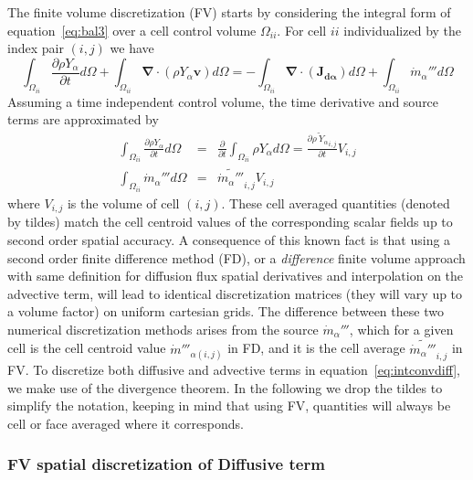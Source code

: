 \documentclass[12pt]{article}
\begin{document}
The finite volume discretization (FV) starts by considering the integral form of equation~\eqref{eq:bal3} over a cell control volume $\Omega_{ii}$. For 
cell $ii$ individualized by the index pair $(i,j)$ we have
%
\begin{equation}
 \int_{\Omega_{ii}} {\frac{\partial \rho Y_\alpha}{\partial t}} d \Omega + \int_{\Omega_{ii}} { \boldsymbol{\nabla} \cdot  \left(  \rho Y_\alpha \mathbf{v} \right)
      } d \Omega  = -\int_{\Omega_{ii}} { \boldsymbol{\nabla} \cdot \left(  \mathbf{J_{d \alpha}}  \right)  } d \Omega + \int_{\Omega_{ii}} { \dot{m}_\alpha''' } d \Omega \label{eq:intconvdiff}
\end{equation}
%
Assuming a time independent control volume, the time derivative and source terms are approximated by
%
\begin{eqnarray}
  \int_{\Omega_{ii}} {\frac{\partial \rho Y_\alpha}{\partial t}} d \Omega & = & \frac{\partial}{\partial t} \int_{\Omega_{ii}} {\rho Y_\alpha} d \Omega 
  = \frac{\partial \widetilde{\rho \: Y_\alpha }_{i,j}}{\partial t} V_{i,j} \\
  \int_{\Omega_{ii}} { \dot{m}_\alpha''' } d \Omega & = & \widetilde{ \dot{m}_\alpha''' }_{i,j} V_{i,j} \label{eq:intcons}
\end{eqnarray}
%
where $V_{i,j}$ is the volume of cell $(i,j)$. These cell averaged quantities (denoted by tildes) match the cell centroid values of the corresponding scalar fields up to second order spatial accuracy. A consequence of this known fact is that using a second order finite difference method (FD), or a \textit{difference} finite volume approach with same definition 
 for diffusion flux spatial derivatives and interpolation on the advective term, will lead to identical discretization matrices (they will vary up to a volume factor) on uniform cartesian grids. The difference between these two numerical discretization methods arises from the source $\dot{m}_\alpha''' $, which for a given cell is the cell centroid value $\dot{m}'''_{\alpha (i,j)}$ in FD, and it is the cell average $ \widetilde{ \dot{m}_\alpha''' }_{i,j}$ in FV. To discretize both diffusive and advective terms in equation~\eqref{eq:intconvdiff}, we make use of the divergence theorem. In the following we drop the tildes to simplify the notation, keeping in mind that using FV, quantities will always be cell or face averaged where it corresponds.

\subsubsection*{FV spatial discretization of Diffusive term} \label{Sec:FVdiff}
\end{document}
